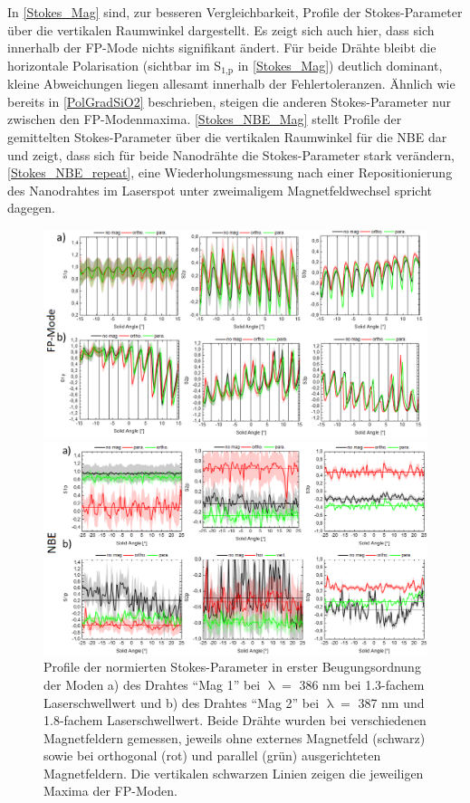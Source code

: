 In \autoref{Stokes_Mag} sind, zur besseren Vergleichbarkeit, Profile der Stokes-Parameter über die vertikalen Raumwinkel dargestellt. Es zeigt sich auch hier, dass sich innerhalb der FP-Mode nichts signifikant ändert. Für beide Drähte bleibt die horizontale Polarisation (sichtbar im S$_\text{1,p}$ in \autoref{Stokes_Mag}) deutlich dominant, kleine Abweichungen liegen allesamt innerhalb der Fehlertoleranzen. Ähnlich wie bereits in \autoref{PolGradSiO2} beschrieben, steigen die anderen Stokes-Parameter nur zwischen den FP-Modenmaxima. \autoref{Stokes_NBE_Mag} stellt Profile der gemittelten Stokes-Parameter über die vertikalen Raumwinkel für die NBE dar und zeigt, dass sich für beide Nanodrähte die Stokes-Parameter stark verändern, \autoref{Stokes_NBE_repeat}, eine Wiederholungsmessung nach einer Repositionierung des Nanodrahtes im Laserspot unter zweimaligem Magnetfeldwechsel spricht dagegen.\begin{figure}[h]
\includegraphics[width=1\textwidth]{Bilder/Mag/Stokes_Mag}
\caption{Profile der normierten Stokes-Parameter in erster Beugungsordnung der Moden a) des Drahtes ``Mag 1''  bei $\uplambda=$ 386 nm bei 1.3-fachem Laserschwellwert und b) des Drahtes ``Mag 2'' bei $\uplambda=$ 387 nm und 1.8-fachem Laserschwellwert. Beide Drähte wurden bei verschiedenen Magnetfeldern gemessen, jeweils ohne externes Magnetfeld (schwarz) sowie bei orthogonal (rot) und parallel (grün) ausgerichteten Magnetfeldern. Die vertikalen schwarzen Linien zeigen die jeweiligen Maxima der FP-Moden.}
\label{Stokes_Mag}
\centering
\includegraphics[width=1\textwidth]{Bilder/Mag/Stokes_NBE_Mag}

\end{figure}
